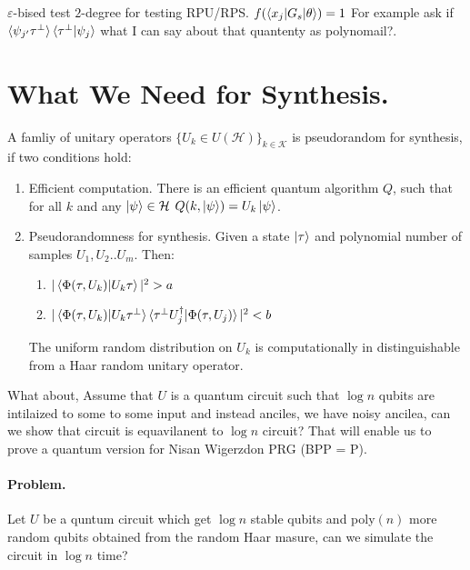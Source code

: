 \documentclass[manuscript,screen,review]{acmart}
\begin{document}
\begin{definition}
  $\varepsilon$-bised test $2$-degree for testing RPU/RPS. $f(\braket{x_{j}|G_{s}|\theta}) = 1$ For example ask if $\braket{\psi_{j^{\prime}}\tau^{\perp}}\braket{\tau^{\perp}|\psi_{j}}$ what I can say about that quantenty as polynomail?. 
\end{definition}

\section{What We Need for Synthesis.}

\begin{definition} A famliy of unitary operators $\{ U_{k} \in U(\mathcal{H}) \}_{k \in \mathcal{K}}$ is pseudorandom for synthesis, if two conditions hold: 
  \begin{enumerate}
    \item Efficient computation. There is an efficient quantum algorithm $Q$, such that for all $k$ and any $\ket{\psi} \in \mathcal{H}$ $Q(k,\ket{\psi}) = U_{k}\ket{\psi}$. 
    \item Pseudorandomness for synthesis. Given a state $\ket{\tau}$ and polynomial number of samples $U_{1},U_{2}..U_{m}$. Then: 
      \begin{enumerate}
        \item $|\braket{\Phi(\tau,U_{k})|U_{k}\tau}|^{2} > a$
        \item $|\braket{\Phi(\tau,U_{k})|U_{k}\tau^{\perp}}\braket{\tau^{\perp}U^{\dagger}_{j}|\Phi(\tau,U_{j})}|^{2} < b$
      \end{enumerate}
      The uniform random distribution on $U_{k}$ is computationally in distinguishable from a Haar random unitary operator. 
  \end{enumerate} 
\end{definition}

What about, Assume that $U$ is a quantum circuit such that $\log n$ qubits are intilaized to some to some input and instead anciles, we have noisy ancilea, can we show that circuit is equavilanent to $\log n $ circuit? That will enable us to prove a quantum version for Nisan Wigerzdon PRG (BPP = P). 

\paragraph{Problem.} Let $U$ be a quntum circuit which get $\log n$ stable qubits and poly$(n)$ more random qubits obtained from the random Haar masure, can we simulate the circuit in $\log n$ time?  
\end{document}
